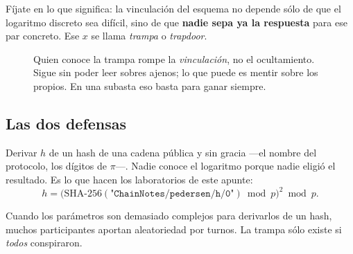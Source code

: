 \documentclass[11pt,a4paper]{article}
\theoremstyle{definition}
\theoremstyle{plain}
\theoremstyle{remark}
\begin{document}
Fíjate en lo que significa: la vinculación del esquema no depende sólo de que el
logaritmo discreto sea difícil, sino de que \textbf{nadie sepa ya la respuesta}
para ese par concreto. Ese $x$ se llama \emph{trampa} o \emph{trapdoor}.

\begin{figure}[htbp]
\centering
{}
\caption{Quien conoce la trampa rompe la \emph{vinculación}, no el ocultamiento.
Sigue sin poder leer sobres ajenos; lo que puede es mentir sobre los propios. En
una subasta eso basta para ganar siempre.}
\label{fig:trapdoor}
\end{figure}

\subsection{Las dos defensas}

\begin{description}[leftmargin=1.4em,style=unboxed,itemsep=0.35em]
  \item[Nothing up my sleeve.] Derivar $h$ de un hash de una cadena pública y sin
    gracia ---el nombre del protocolo, los dígitos de $\pi$---. Nadie conoce el
    logaritmo porque nadie eligió el resultado. Es lo que hacen los laboratorios
    de este apunte:
    \[
      h = \bigl(\mathrm{SHA\text{-}256}(\texttt{"ChainNotes/pedersen/h/0"})
          \bmod p\bigr)^{2} \bmod p .
    \]
  \item[Ceremonia multiparte.] Cuando los parámetros son demasiado complejos para
    derivarlos de un hash, muchos participantes aportan aleatoriedad por turnos.
    La trampa sólo existe si \emph{todos} conspiraron.
\end{description}
\end{document}

